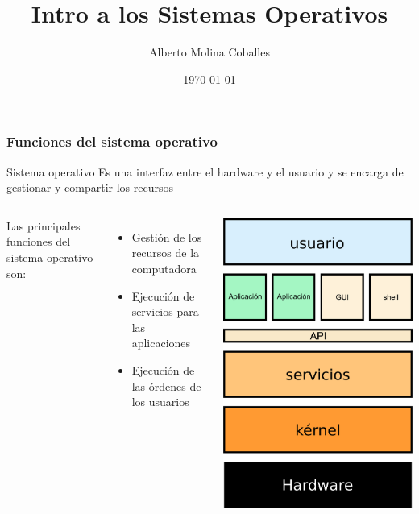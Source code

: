 \documentclass{beamer}
\author{Alberto Molina Coballes}
\title{Intro a los Sistemas Operativos}
\institute{IES Gonzalo Nazareno}
\date{\today}
\begin{document}
\begin{frame}[t,plain]
\titlepage
\end{frame}

\begin{frame}
  \frametitle{Funciones del sistema operativo}
  \begin{block}{Sistema operativo}
    Es una interfaz entre el hardware y el usuario y se encarga de gestionar y compartir los recursos
  \end{block}
  \begin{columns}
    Las principales funciones del sistema operativo son:
      \begin{itemize}
      \item Gestión de los recursos de la computadora
      \item Ejecución de servicios para las aplicaciones
      \item Ejecución de las órdenes de los usuarios
      \end{itemize}
    \begin{center}
      \includegraphics[width=\columnwidth]{img/SO.png}    
    \end{center}
  \end{columns}
\end{frame}
\end{document}
